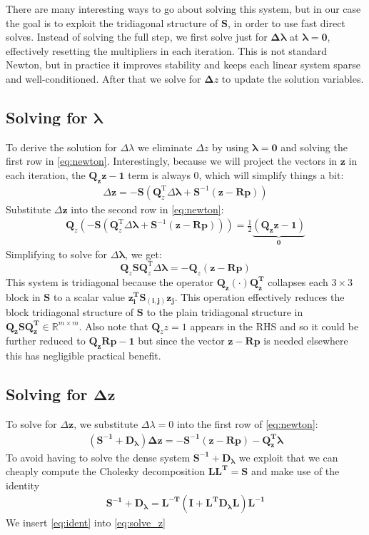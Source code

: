 \documentclass[14pt]{extarticle}
\newcommand*{\vv}[1]{\mathbf{#1}}
\newcommand{\T}{\text{T}}
\begin{document}
There are many interesting ways to go about solving this system, but in our case
the goal is to exploit the tridiagonal structure of $\vv S$, in order to
use fast direct solves. Instead of solving the full step, we first solve just
for $\vv{\Delta \lambda}$ at $\vv{\lambda = 0}$, effectively resetting the
multipliers in each iteration. This is not standard Newton, but in practice it
improves stability and keeps each linear system sparse and well-conditioned.
After that we solve for $\vv \Delta z$ to update the solution variables.

\subsection{Solving for $\vv{\lambda}$}
To derive the solution for \(\Delta \lambda\) we eliminate \(\Delta z\) by using
$\vv{\lambda = 0}$ and solving the first row in \eqref{eq:newton}.
Interestingly, because we will
project the vectors in $\vv z$ in each iteration, the $\vv{Q_z z-1}$ term is
always $0$, which will simplify things a bit:
\begin{align*}
\Delta \vv z = -\vv S (\vv Q^{\T}_z \Delta \vv \lambda + \vv S^{-1}(\vv z - \vv R
\vv p))
\end{align*}
Substitute \(\Delta \vv z\) into the second row in \eqref{eq:newton}:
\begin{align*}
\vv Q_z (-\vv S (\vv Q^{\T}_z \Delta \vv \lambda + \vv S^{-1}(\vv z - \vv R \vv
p))) = \frac{1}{2}\underbrace{\vv{(Q_z z-1)}}_{\vv 0}
\end{align*}
Simplifying to solve for \(\Delta \vv \lambda\), we get:
\[
\vv Q_z \vv S \vv Q^{\T}_z \Delta \vv \lambda = -\vv Q_z (\vv z - \vv R \vv p)
\]
This system is tridiagonal because the operator \(\vv{ Q_z(\cdot)Q_z^{\T}} \)
collapses each \( 3 \times 3 \) block in \( \vv S \) to a scalar
value \(\vv{ z_i^T S_{(i,j)} z_j }\). This operation effectively reduces the
block
tridiagonal structure of \(\vv S \) to the plain tridiagonal structure in \(\vv{
Q_zSQ_z^{\T}} \in \mathbb R^{m\times m} \). Also note that $\vv Q_z z = 1$
appears in the RHS and so it could be further reduced to $\vv{Q_z R p - 1}$ but
since the vector $\vv{z-Rp}$ is needed elsewhere this has negligible practical
benefit.

\subsection{Solving for $\vv{\Delta z}$}
To solve for \(\Delta \vv z\), we substitute \(\Delta \lambda = 0\) into the
first row of \eqref{eq:newton}:
\begin{align}
\vv{(S^{-1} + D_\lambda) \Delta z = -S^{-1} (z - Rp) - Q_z^{\T} \lambda}
\label{eq:solve_z}
\end{align}
To avoid having to solve the dense system $\vv{S^{-1}+D_\lambda}$ we exploit
that we can cheaply compute the Cholesky decomposition $\vv{ LL^{\T} = S}$ and
make use of the identity
\begin{align}
\vv{S^{-1} + D_\lambda = L^{-T} (I + L^T D_\lambda L) L^{-1}} \label{eq:ident}
\end{align}
We insert \eqref{eq:ident} into \eqref{eq:solve_z}
\end{document}
